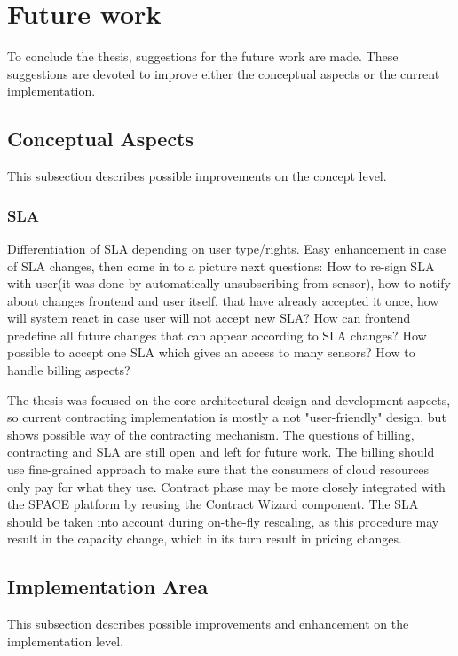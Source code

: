  \section{Future work}
	To conclude the thesis, suggestions for the future work are made. These suggestions are devoted to improve either the conceptual aspects or the current implementation.

\subsection{Conceptual Aspects}
	This subsection describes possible improvements on the concept level.
		\subsubsection {SLA}
		Differentiation of SLA depending on user type/rights. Easy enhancement in case of SLA changes, then come in to a picture next questions: How to re-sign SLA with user(it was done by automatically unsubscribing from sensor), how to notify about changes frontend and user itself, that have already accepted it once, how will system react in case user will not accept new SLA? How can frontend predefine all future changes that can appear according to SLA changes? How possible to accept one SLA which gives an access to many sensors? How to handle billing aspects?

		The thesis was focused on the core architectural design and development aspects, so current contracting implementation is mostly a not "user-friendly" design, but shows possible way of the contracting mechanism. The questions of billing, contracting and SLA are still open and left for future work. The billing should use fine-grained approach to make sure that the consumers of cloud resources only pay for what they use. Contract phase may be more closely integrated with the SPACE platform by reusing the Contract Wizard component. The SLA should be taken into account during on-the-fly rescaling, as this procedure may result in the capacity change, which in its turn result in pricing changes. 

	\subsection{Implementation Area}
    This subsection describes possible improvements and enhancement on the implementation level.

